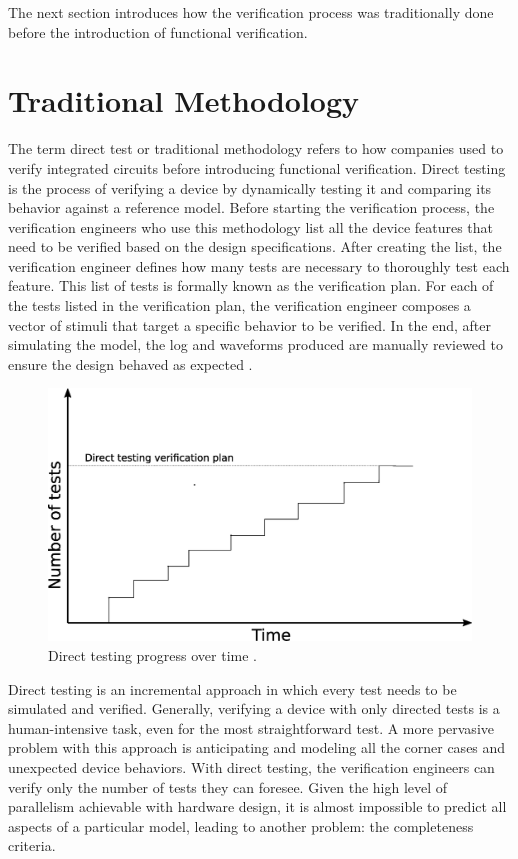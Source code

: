 The next section introduces how the verification process was traditionally done
before the introduction of functional verification.

\section{Traditional Methodology}\label{sec:traditionalmethodology}
The term direct test or traditional methodology refers to how companies used to
verify integrated circuits before introducing functional verification. Direct
testing is the process of verifying a device by dynamically testing it and
comparing its behavior against a reference model. Before starting the
verification process, the verification engineers who use this methodology list
all the device features that need to be verified based on the design
specifications. After creating the list, the verification engineer defines how
many tests are necessary to thoroughly test each feature. This list of tests is
formally known as the verification plan. For each of the tests listed in the
verification plan, the verification engineer composes a vector of stimuli that
target a specific behavior to be verified. In the end, after simulating the
model, the log and waveforms produced are manually reviewed to ensure the design
behaved as expected \cite{spear2008systemverilog}.

\begin{figure}
\centering
\includegraphics[width=0.6\linewidth]{pictures/Direct_testing.eps}
\caption{Direct testing progress over time \cite{spear2008systemverilog}.}
\label{fig:testingprogresstimedirect}
\end{figure}

Direct testing is an incremental approach in which every test needs to be
simulated and verified. Generally, verifying a device with only directed tests
is a human-intensive task, even for the most straightforward test. A more
pervasive problem with this approach is anticipating and modeling all the corner
cases and unexpected device behaviors. With direct testing, the verification
engineers can verify only the number of tests they can foresee. Given the high
level of parallelism achievable with hardware design, it is almost impossible to
predict all aspects of a particular model, leading to another problem: the
completeness criteria.

